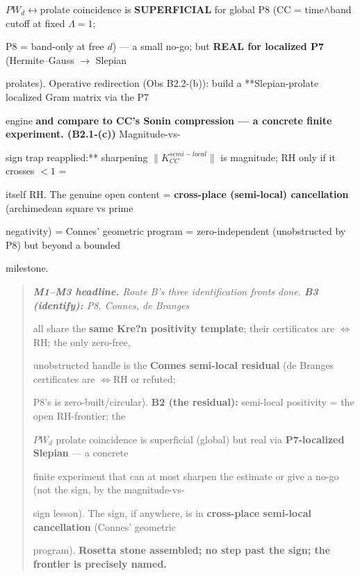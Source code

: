 \documentclass[10pt]{article}
\begin{document}
  $PW_d$\ensuremath{\leftrightarrow}prolate coincidence is \textbf{SUPERFICIAL} for global P8 (CC = time\ensuremath{\wedge}band cutoff at fixed $\Lambda=1$;\par
  P8 = band-only at free $d$) --- a small no-go; but \textbf{REAL for localized P7} (Hermite--Gauss \ensuremath{\to} Slepian\par
  prolates). Operative redirection (Obs B2.2-(b)): build a **Slepian-prolate localized Gram matrix via the P7\par
  engine\textbf{ and compare to CC's Sonin compression --- a concrete finite experiment. (B2.1-(c)) }Magnitude-vs-\par
  sign trap reapplied:** sharpening $\|K_{CC}^{semi-local}\|$ is magnitude; RH only if it crosses $<1$ =\par
  itself RH. The genuine open content = \textbf{cross-place (semi-local) cancellation} (archimedean square vs prime\par
  negativity) = Connes' geometric program = zero-independent (unobstructed by P8) but beyond a bounded\par
  milestone.\par

\begin{quote}\itshape
\textbf{M1--M3 headline.} Route B's three identification fronts done. \textbf{B3 (identify):} P8, Connes, de Branges\par
all share the \textbf{same Kre?n positivity template}; their certificates are $\iff$ RH; the only zero-free,\par
unobstructed handle is the \textbf{Connes semi-local residual} (de Branges certificates are $\iff$RH or refuted;\par
P8's is zero-built/circular). \textbf{B2 (the residual):} semi-local positivity = the open RH-frontier; the\par
$PW_d$ prolate coincidence is superficial (global) but real via \textbf{P7-localized Slepian} --- a concrete\par
finite experiment that can at most sharpen the estimate or give a no-go (not the sign, by the magnitude-vs-\par
sign lesson). The sign, if anywhere, is in \textbf{cross-place semi-local cancellation} (Connes' geometric\par
program). \textbf{Rosetta stone assembled; no step past the sign; the frontier is precisely named.}\par
\end{quote}
\end{document}
